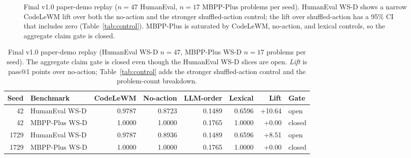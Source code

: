 \documentclass[11pt]{article}
\newcommand{\modelname}{CodeLeWM}
\begin{document}
\begin{figure}[t]
\centering
{}
\caption{Final v1.0 paper-demo replay ($n=47$ HumanEval, $n=17$ MBPP-Plus
problems per seed). HumanEval WS-D shows a narrow \modelname{} lift over both the
no-action and the stronger shuffled-action control; the lift over
shuffled-action has a 95\% CI that includes zero (Table~\ref{tab:control}).
MBPP-Plus is saturated by \modelname{}, no-action, and lexical controls, so the
aggregate claim gate is closed.}
\label{fig:downstream}
\end{figure}

\begin{table}[t]
\centering
\caption{Final v1.0 paper-demo replay (HumanEval WS-D $n=47$, MBPP-Plus WS-D
$n=17$ problems per seed). The aggregate claim gate is closed even though the
HumanEval WS-D slices are open. \emph{Lift} is pass@1 points over no-action;
Table~\ref{tab:control} adds the stronger shuffled-action control and the
problem-count breakdown.}
\label{tab:demo}
\small
\begin{tabular}{rlrrrrrl}
\toprule
Seed & Benchmark & CodeLeWM & No-action & LLM-order & Lexical & Lift & Gate \\
\midrule
42 & HumanEval WS-D & 0.9787 & 0.8723 & 0.1489 & 0.6596 & +10.64 & open \\
42 & MBPP-Plus WS-D & 1.0000 & 1.0000 & 0.1765 & 1.0000 & +0.00 & closed \\
1729 & HumanEval WS-D & 0.9787 & 0.8936 & 0.1489 & 0.6596 & +8.51 & open \\
1729 & MBPP-Plus WS-D & 1.0000 & 1.0000 & 0.1765 & 1.0000 & +0.00 & closed \\
\bottomrule
\end{tabular}
\end{table}
\end{document}
